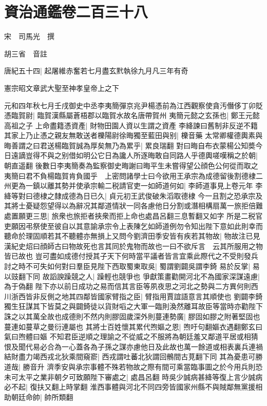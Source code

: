 \section{資治通鑑卷二百三十八}
宋　司馬光　撰

胡三省　音註

唐紀五十四|{
	起屠維赤奮若七月盡玄黓執徐九月凡三年有奇}


憲宗昭文章武大聖至神孝皇帝上之下

元和四年秋七月壬戌御史中丞李夷簡彈京兆尹楊憑前為江西觀察使貪汚僭侈丁卯貶憑臨賀尉|{
	臨賀漢縣屬蒼梧郡以臨賀水故名唐帶賀州}
夷簡元懿之玄孫也|{
	鄭王元懿高祖之子}
上命盡籍憑資產|{
	財物田園人資以生謂之資產}
李絳諫曰舊制非反逆不籍其家上乃止憑之親友無敢送者櫟陽尉徐晦獨至藍田與别|{
	櫟音藥}
太常卿權德輿素與晦善謂之曰君送楊臨賀誠為厚矣無乃為累乎|{
	累良瑞翻}
對曰晦自布衣蒙楊公知奬今日遠謫豈得不與之别借如明公它日為讒人所逐晦敢自同路人乎德輿嗟嘆稱之於朝|{
	朝直遥翻}
後數日李夷簡奏為監察御史晦謝曰晦平生未嘗得望公顔色公何從而取之夷簡曰君不負楊臨賀肯負國乎　上密問諸學士曰今欲用王承宗為成德留後割德棣二州更為一鎮以離其勢并使承宗輸二税請官吏一如師道何如|{
	李師道事見上卷元年}
李絳等對曰德棣之隸成德為日已久|{
	貞元初王武俊破朱滔取德棣}
今一且割之恐承宗及其將士憂疑怨望得以為辭况其鄰道情狀一同各慮他日分割或潛相構扇萬一旅拒倍難處置願更三思|{
	旅衆也旅拒者挾衆而拒上命也處昌呂翻三息暫翻又如字}
所是二税官吏願因弔祭使至彼自以其意諭承宗令上表陳乞如師道例勿令知出陛下意如此則幸而聽命於理固順若其不聽體亦無損上又問今劉濟田季安皆有疾若其物故|{
	物故注已見漢紀史炤曰顔師古曰物故死也言其同於鬼物而故也一曰不欲斥言　云其所服用之物皆已故也}
豈可盡如成德付授其子天下何時當平議者皆言宜乘此際代之不受則發兵討之時不可失如何對曰羣臣見陛下西取蜀東取吳|{
	蜀謂劉闢吳謂李錡}
易於反掌|{
	易以豉翻下同}
故謟諛躁競之人|{
	躁輕也競爭也}
爭獻策畫勸開河北不為國家深謀遠慮|{
	為于偽翻}
陛下亦以前日成功之易而信其言臣等夙夜思之河北之勢與二方異何則西川浙西皆非反側之地其四鄰皆國家臂指之臣|{
	臂指用賈誼語意言其順使也}
劉闢李錡獨生狂謀其下皆莫之與闢錡徒以貨財㗖之大軍一臨則渙然離耳故臣等當時亦勸陛下誅之以其萬全故也成德則不然内則膠固歲深外則蔓連勢廣|{
	膠固如膠之附著堅固也蔓連如蔓草之曼衍連屬也}
其將士百姓懷其累代喣嫗之恩|{
	喣吁句翻嫗衣遇翻鄭玄曰氣曰喣體曰嫗}
不知君臣逆順之理諭之不從威之不服將為朝廷羞又鄰道平居或相猜恨及聞代易必合為一心蓋各為子孫之謀亦慮他日及此故也萬一餘道或相表裏兵連禍結財盡力竭西戎北狄乘間窺窬|{
	西戎謂吐蕃北狄謂回鶻間古莧翻下同}
其為憂患可勝道哉|{
	勝音升}
濟季安與承宗事體不殊若物故之際有間可乘當臨事圖之於今用兵則恐未可太平之業非朝夕可致願陛下審處之|{
	處昌呂翻}
時吳少誠病甚絳等復上言少誠病必不起|{
	復扶又翻上時掌翻}
淮西事體與河北不同四旁皆國家州縣不與賊鄰無黨援相助朝廷命帥|{
	帥所類翻}
